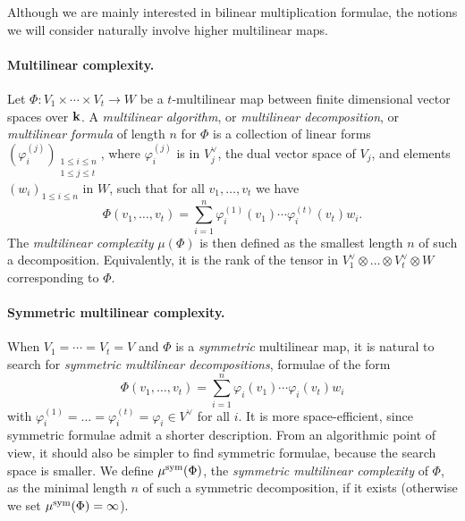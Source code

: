 \documentclass[11pt]{article}
\begin{document}
Although we are mainly interested in bilinear multiplication formulae,
the notions we will consider naturally involve higher multilinear maps.

\paragraph{Multilinear complexity.}
Let $\Phi:V_1\times\cdots\times V_t\to W$
be a $t$-multilinear map between finite dimensional vector spaces over $\mathbf{k}$.
A \emph{multilinear algorithm}, or \emph{multilinear decomposition}, or
\emph{multilinear formula} of length $n$ for $\Phi$ is a collection of linear
forms $(\varphi_i^{(j)})_{\substack{1\leq i \leq n\\1\leq j\leq t}}$,
where $\varphi_i^{(j)}$ is in $V_j^\vee$, the dual vector space of $V_j$,
and elements $(w_i)_{1\leq i \leq n}$ in $W$, 
such that for all $v_1,\dots,v_t$ we have
\[
  \Phi(v_1,\dots,v_t)=\sum_{i=1}^{n}\varphi_i^{(1)}(v_1)\cdots\varphi_i^{(t)}(v_t)w_i.
\]
The \emph{multilinear complexity} $\mu(\Phi)$ is then defined as the smallest
length $n$ of such a decomposition.
Equivalently, it is the rank of the tensor in
$V_1^\vee \otimes\dots\otimes V_t^\vee\otimes W$
corresponding to $\Phi$.

\paragraph{Symmetric multilinear complexity.}
When $V_1=\cdots=V_t=V$ and $\Phi$ is a \emph{symmetric} multilinear map, it is
natural to search for \emph{symmetric multilinear decompositions}, \ie formulae of the form
\begin{equation*}
  \Phi(v_1,\dots,v_t)=\sum_{i=1}^{n}\varphi_i(v_1)\cdots\varphi_i(v_t)w_i
\end{equation*}
with $\varphi_i^{(1)}=\dots=\varphi_i^{(t)}=\varphi_i\in V^\vee$ for all $i$.
It is more space-efficient, since symmetric formulae admit a shorter description.
From an algorithmic point of view, it should also be simpler to find symmetric formulae,
because the search space is smaller. 
We define $\mu^{\textrm{sym}}(\Phi)$,
the \emph{symmetric multilinear complexity} of $\Phi$,
as the minimal length $n$ of such a symmetric decomposition, if it exists
(otherwise we set $\mu^{\textrm{sym}}(\Phi)=\infty$).
\end{document}

